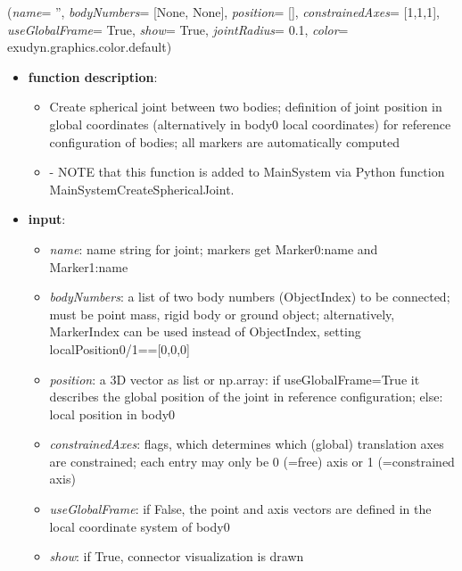 %
\begin{flushleft}
\label{sec:mainsystemextensions:CreateSphericalJoint}
({\it name}= '', {\it bodyNumbers}= [None, None], {\it position}= [], {\it constrainedAxes}= [1,1,1], {\it useGlobalFrame}= True, {\it show}= True, {\it jointRadius}= 0.1, {\it color}= exudyn.graphics.color.default)
\end{flushleft}
\setlength{\itemindent}{0.7cm}
\begin{itemize}[leftmargin=0.7cm]
\item[--]
{\bf function description}: \vspace{-6pt}
\begin{itemize}[leftmargin=1.2cm]
\setlength{\itemindent}{-0.7cm}
\item[]Create spherical joint between two bodies; definition of joint position in global coordinates (alternatively in body0 local coordinates) for reference configuration of bodies; all markers are automatically computed
\item[]- NOTE that this function is added to MainSystem via Python function MainSystemCreateSphericalJoint.
\end{itemize}
\item[--]
{\bf input}: \vspace{-6pt}
\begin{itemize}[leftmargin=1.2cm]
\setlength{\itemindent}{-0.7cm}
\item[]{\it name}: name string for joint; markers get Marker0:name and Marker1:name
\item[]{\it bodyNumbers}: a list of two body numbers (ObjectIndex) to be connected; must be point mass, rigid body or ground object; alternatively, MarkerIndex can be used instead of ObjectIndex, setting localPosition0/1==[0,0,0]
\item[]{\it position}: a 3D vector as list or np.array: if useGlobalFrame=True it describes the global position of the joint in reference configuration; else: local position in body0
\item[]{\it constrainedAxes}: flags, which determines which (global) translation axes are constrained; each entry may only be 0 (=free) axis or 1 (=constrained axis)
\item[]{\it useGlobalFrame}: if False, the point and axis vectors are defined in the local coordinate system of body0
\item[]{\it show}: if True, connector visualization is drawn

\end{itemize}
\end{itemize}
